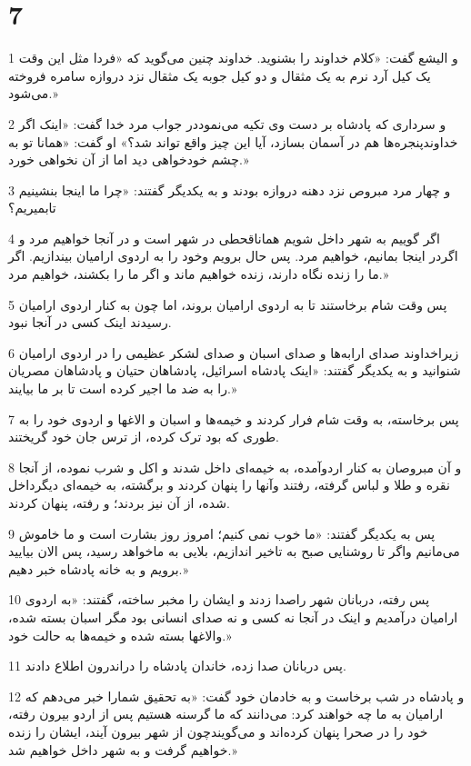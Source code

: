 \chapter{7}

\par 1 و الیشع گفت: «کلام خداوند را بشنوید. خداوند چنین می‌گوید که «فردا مثل این وقت یک کیل آرد نرم به یک مثقال و دو کیل جوبه یک مثقال نزد دروازه سامره فروخته می‌شود.»
\par 2 و سرداری که پادشاه بر دست وی تکیه می‌نموددر جواب مرد خدا گفت: «اینک اگر خداوندپنجره‌ها هم در آسمان بسازد، آیا این چیز واقع تواند شد؟» او گفت: «همانا تو به چشم خودخواهی دید اما از آن نخواهی خورد.»
\par 3 و چهار مرد مبروص نزد دهنه دروازه بودند و به یکدیگر گفتند: «چرا ما اینجا بنشینیم تابمیریم؟
\par 4 اگر گوییم به شهر داخل شویم هماناقحطی در شهر است و در آنجا خواهیم مرد و اگردر اینجا بمانیم، خواهیم مرد. پس حال برویم وخود را به اردوی ارامیان بیندازیم. اگر ما را زنده نگاه دارند، زنده خواهیم ماند و اگر ما را بکشند، خواهیم مرد.»
\par 5 پس وقت شام برخاستند تا به اردوی ارامیان بروند، اما چون به کنار اردوی ارامیان رسیدند اینک کسی در آنجا نبود.
\par 6 زیراخداوند صدای ارابه‌ها و صدای اسبان و صدای لشکر عظیمی را در اردوی ارامیان شنوانید و به یکدیگر گفتند: «اینک پادشاه اسرائیل، پادشاهان حتیان و پادشاهان مصریان را به ضد ما اجیر کرده است تا بر ما بیایند.»
\par 7 پس برخاسته، به وقت شام فرار کردند و خیمه‌ها و اسبان و الاغها و اردوی خود را به طوری که بود ترک کرده، از ترس جان خود گریختند.
\par 8 و آن مبروصان به کنار اردوآمده، به خیمه‌ای داخل شدند و اکل و شرب نموده، از آنجا نقره و طلا و لباس گرفته، رفتند وآنها را پنهان کردند و برگشته، به خیمه‌ای دیگرداخل شده، از آن نیز بردند؛ و رفته، پنهان کردند.
\par 9 پس به یکدیگر گفتند: «ما خوب نمی کنیم؛ امروز روز بشارت است و ما خاموش می‌مانیم واگر تا روشنایی صبح به تاخیر اندازیم، بلایی به ماخواهد رسید، پس الان بیایید برویم و به خانه پادشاه خبر دهیم.»
\par 10 پس رفته، دربانان شهر راصدا زدند و ایشان را مخبر ساخته، گفتند: «به اردوی ارامیان درآمدیم و اینک در آنجا نه کسی و نه صدای انسانی بود مگر اسبان بسته شده، والاغها بسته شده و خیمه‌ها به حالت خود.»
\par 11 پس دربانان صدا زده، خاندان پادشاه را دراندرون اطلاع دادند.
\par 12 و پادشاه در شب برخاست و به خادمان خود گفت: «به تحقیق شمارا خبر می‌دهم که ارامیان به ما چه خواهند کرد: می‌دانند که ما گرسنه هستیم پس از اردو بیرون رفته، خود را در صحرا پنهان کرده‌اند و می‌گویندچون از شهر بیرون آیند، ایشان را زنده خواهیم گرفت و به شهر داخل خواهیم شد.»
